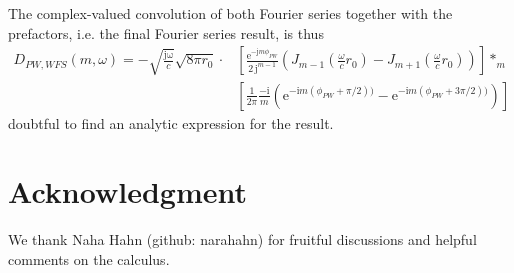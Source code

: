 \documentclass[a4paper,BCOR=15mm,10pt,twoside]{scrartcl}
\newcommand\e{\mathrm{e}}  %
\newcommand\im{\mathrm{j}}  %
\begin{document}

The complex-valued convolution of both Fourier series together with the prefactors, i.e. the final Fourier series result, is thus 
\begin{align}
D_{PW,WFS}(m,\omega) = 
-\sqrt{\frac{\mathrm{j \omega}}{c}} \sqrt{8 \pi r_0} \cdot
&\left[\frac{\mathrm{e}^{- \mathrm{j} m \phi_{PW}}}{2\,\mathrm{j}^{m-1}}
(J_{m-1}(\frac{\omega}{c} r_0) - J_{m+1}(\frac{\omega}{c} r_0))\right]
*_m \\
&\left[\frac{1}{2 \pi} \frac{-\mathrm{i}}{m} (\mathrm{e}^{- \mathrm{i} m (\phi_{PW}+\pi/2))}-\mathrm{e}^{- \mathrm{i} m (\phi_{PW}+3\pi/2)) })\right]
\end{align}
doubtful to find an analytic expression for the result.


\section{Acknowledgment}
We thank Naha Hahn (github: narahahn) for fruitful discussions and helpful comments on the calculus.



\end{document}
